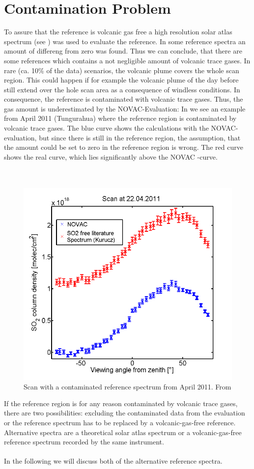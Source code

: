 \section{Contamination Problem\label{Chap:Cont}}
To assure that the reference is volcanic gas free a high resolution solar atlas spectrum (see ) was used to evaluate the reference. In some reference spectra an amount of   differeng from zero was found. Thus we can conclude, that there are some references which contains a not negligible amount of volcanic trace gases.
In rare (ca. 10\% of the data) scenarios, the
volcanic plume covers the whole scan region.
This could happen if for example the volcanic plume of the day before still extend over the hole scan area as a consequence of windless conditions.
In consequence, the reference	is contaminated with volcanic trace gases. Thus, the gas amount is underestimated by the NOVAC-Evaluation: In  we see an example from April 2011 (Tungurahua) where the reference region is contaminated by volcanic trace gases. The blue  curve shows the calculations with the NOVAC-evaluation, but since there is still  in the reference region, the assumption, that the  amount could be set to zero in the reference region is wrong. The red curve shows the real  curve, which lies significantly above the NOVAC -curve.\\
\\	
%
\\
\begin{figure}
	\centering
	\includegraphics[width=0.7\linewidth]{Bilder/contaminated}
	\caption{Scan with a contaminated reference spectrum from April 2011. From \cite{WarnachSimon}}
	\label{fig:contaminated}
\end{figure}
If the reference region is for any reason
contaminated by volcanic trace gases, there are two possibilities: excluding the contaminated data from the evaluation or the reference spectrum has to be
replaced by a volcanic-gas-free reference. Alternative spectra are a
theoretical solar atlas spectrum or a volcanic-gas-free reference
spectrum recorded by the same instrument.\\ 
%
\\
%
In the following we will discuss both of the alternative reference spectra.
%
